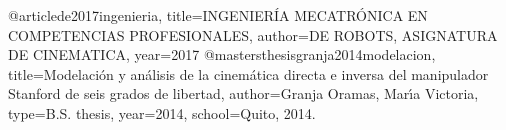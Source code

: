 @article{de2017ingenieria,
  title={INGENIER{\'I}A MECATR{\'O}NICA EN COMPETENCIAS PROFESIONALES},
  author={DE ROBOTS, ASIGNATURA DE CINEMATICA},
  year={2017}
}
@mastersthesis{granja2014modelacion,
  title={Modelaci{\'o}n y an{\'a}lisis de la cinem{\'a}tica directa e inversa del manipulador Stanford de seis grados de libertad},
  author={Granja Oramas, Mar{\'\i}a Victoria},
  type={{B.S.} thesis},
  year={2014},
  school={Quito, 2014.}
}
